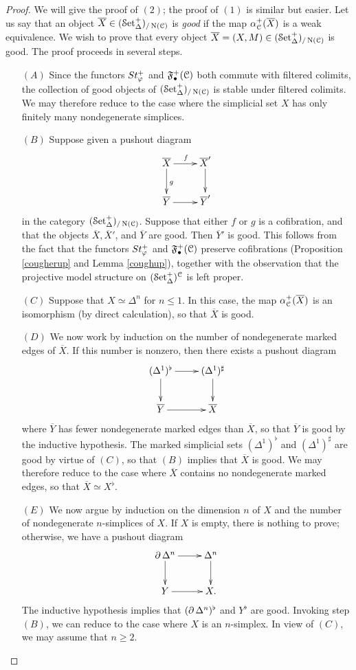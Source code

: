 \begin{proof}
We will give the proof of $(2)$; the proof of $(1)$ is similar but easier. Let us say that an object
$\overline{X} \in (\operatorname{\mathcal{S}et}^{+}_{\Delta})_{/\operatorname{N}(\operatorname{\mathcal{C}})}$ is {\it good} if the map $\alpha^{+}_{\operatorname{\mathcal{C}}}( \overline{X})$ is a weak equivalence. We wish to prove that every object $\overline{X} = (X,M) \in (\operatorname{\mathcal{S}et}^{+}_{\Delta})_{/ \operatorname{N}(\operatorname{\mathcal{C}})}$ is good. The proof proceeds in several steps.
\begin{itemize}
\item[$(A)$] Since the functors $St^{+}_{\varphi}$ and ${\mathfrak F}^{+}_{\bullet}(\operatorname{\mathcal{C}})$ both commute with filtered colimits, the collection of good objects of $(\operatorname{\mathcal{S}et}^{+}_{\Delta})_{/ \operatorname{N}(\operatorname{\mathcal{C}})}$ is stable under filtered colimits.
We may therefore reduce to the case where the simplicial set $X$ has only finitely many nondegenerate simplices.
\item[$(B)$] Suppose given a pushout diagram
$$ \xymatrix{ \overline{X} \ar[r]^{f} \ar[d]^{g} & \overline{X}' \ar[d] \\
\overline{Y} \ar[r] & \overline{Y}' }$$
in the category $(\operatorname{\mathcal{S}et}^{+}_{\Delta})_{/ \operatorname{N}(\operatorname{\mathcal{C}}) }$. Suppose that either $f$ or $g$ is a cofibration, and that
the objects $\overline{X}, \overline{X}'$, and $\overline{Y}$ are good. Then $\overline{Y}'$ is good.
This follows from the fact that the functors $St^{+}_{\varphi}$ and ${\mathfrak F}^{+}_{\bullet}(\operatorname{\mathcal{C}})$ preserve cofibrations (Proposition \ref{cougherup} and Lemma \ref{coughup}), together with the observation that the projective model structure on $(\operatorname{\mathcal{S}et_{\Delta}^{+}})^{\operatorname{\mathcal{C}}}$ is left proper. 
\item[$(C)$] Suppose that $X \simeq \Delta^n$ for $n \leq 1$. In this case,
the map $\alpha^{+}_{\operatorname{\mathcal{C}}}( \overline{X})$ is an isomorphism (by direct calculation), so that $\overline{X}$ is good.
\item[$(D)$] We now work by induction on the number of nondegenerate marked edges of $\overline{X}$.
If this number is nonzero, then there exists a pushout diagram
$$ \xymatrix{ (\Delta^1)^{\flat} \ar[r] \ar[d] & (\Delta^1)^{\sharp} \ar[d] \\
\overline{Y} \ar[r] & \overline{X} }$$
where $\overline{Y}$ has fewer nondegenerate marked edges than $\overline{X}$, so that
$\overline{Y}$ is good by the inductive hypothesis. The marked simplicial sets
$(\Delta^1)^{\flat}$ and $(\Delta^1)^{\sharp}$ are good by virtue of $(C)$, so that $(B)$ implies that
$\overline{X}$ is good. We may therefore reduce to the case where $\overline{X}$ contains no nondegenerate marked edges, so that $\overline{X} \simeq X^{\flat}$.
\item[$(E)$] We now argue by induction on the dimension $n$ of $X$ and the number of nondegenerate $n$-simplices of $X$. If $X$ is empty, there is nothing to prove; otherwise, we have a pushout diagram
$$ \xymatrix{ \bd \Delta^n \ar[r] \ar[d] & \Delta^n \ar[d] \\
Y \ar[r] & X. }$$
The inductive hypothesis implies that $( \operatorname{\partial} \Delta^n)^{\flat}$ and $Y^{\flat}$ are good.
Invoking step $(B)$, we can reduce to the case where $X$ is an $n$-simplex. In view of
$(C)$, we may assume that $n \geq 2$.


\end{itemize}
\end{proof}
